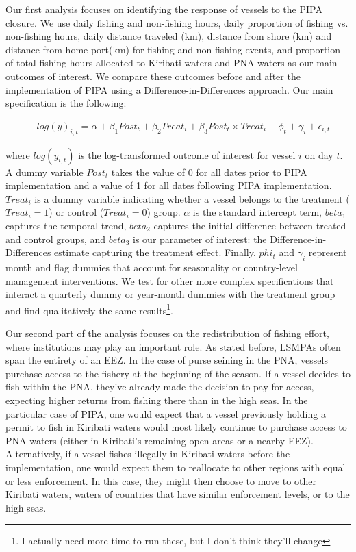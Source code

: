 \documentclass[9pt,twoside,lineno]{pnas-new}
\begin{document}
Our first analysis focuses on identifying the response of 
vessels to the PIPA closure. We use daily fishing and non-fishing hours,
daily proportion of fishing vs. non-fishing hours, daily distance traveled (km), 
distance from shore (km) and distance from home port(km) for fishing and non-fishing events,
and proportion of total fishing hours allocated to Kiribati waters and PNA waters
as our main outcomes of interest.
We compare these outcomes before and after the implementation
of PIPA using a Difference-in-Differences approach. Our main
specification is the following:

\begin{figure}[h]
\begin{align*}
log(y)_{i,t} = \alpha + \beta_1 Post_t + \beta_2 Treat_i + \beta_3 Post_t \times Treat_i + \phi_t + \gamma_i + \epsilon_{i,t}
\label{eqn:did}
\end{align*}
\end{figure}

where $log(y_{i,t})$ is the log-transformed outcome of interest for vessel $i$ on day $t$.
A dummy variable $Post_t$ takes the value of 0 for all
dates prior to PIPA implementation and a value of 1 for all dates
following PIPA implementation. $Treat_i$ is a dummy
variable indicating whether a vessel belongs to the treatment ($Treat_i = 1$) or control
($Treat_i = 0$) group. $\alpha$ is
the standard intercept term, $beta_1$ captures the temporal trend,
$beta_2$ captures the initial difference between treated and control groups,
and $beta_3$ is our parameter of interest: the Difference-in-Differences estimate capturing
the treatment effect. Finally, $phi_t$ and $\gamma_i$ represent
month and flag dummies that account for seasonality or
country-level management interventions. We test for other more complex specifications
that interact a quarterly dummy or year-month dummies with the treatment group
and find qualitatively the same results\footnote{I actually need more time to run these, but I don't think they'll change}.

Our second part of the analysis focuses on the redistribution of fishing
effort, where institutions may play an important role. As stated
before, LSMPAs often span the entirety of an EEZ. In the case of purse
seining in the PNA, vessels purchase access to the fishery at the
beginning of the season. If a vessel decides to fish within the PNA,
they've already made the decision to pay for access, expecting higher
returns from fishing there than in the high seas. In the particular case
of PIPA, one would expect that a vessel previously holding a permit to fish in
Kiribati waters would 
most likely continue to purchase access to PNA waters (either in Kiribati's
remaining open areas or a nearby EEZ). Alternatively, if a vessel fishes illegally
in Kiribati waters before the implementation, one would expect them to
reallocate to other regions with equal or less enforcement. In this
case, they might then choose to move to other Kiribati waters, waters
of countries that have similar enforcement levels, or to the high seas.
\end{document}
